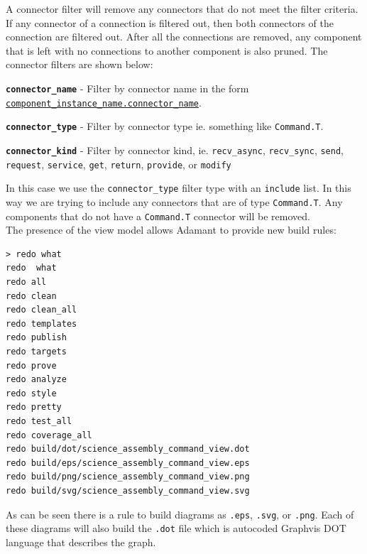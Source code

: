 A connector filter will remove any connectors that do not meet the filter criteria. If any connector of a connection is filtered out, then both connectors of the connection are filtered out. After all the connections are removed, any component that is left with no connections to another component is also pruned. The connector filters are shown below:

\vspace{5mm} %
\begin{spaceditemize}
  \item \textbf{\texttt{connector\_name}} - Filter by connector name in the form \texttt{\url{component\_instance\_name.connector\_name}}.
  \item \textbf{\texttt{connector\_type}} - Filter by connector type ie. something like \texttt{Command.T}.
  \item \textbf{\texttt{connector\_kind}} - Filter by connector kind, ie. \texttt{recv\_async}, \texttt{recv\_sync}, \texttt{send}, \texttt{request}, \texttt{service}, \texttt{get}, \texttt{return}, \texttt{provide}, or \texttt{modify}
\end{spaceditemize}
\vspace{5mm} %

In this case we use the \texttt{connector\_type} filter type with an \texttt{include} list. In this way we are trying to include any connectors that are of type \texttt{Command.T}. Any components that do not have a \texttt{Command.T} connector will be removed. \\

The presence of the view model allows Adamant to provide new build rules:

\vspace{5mm} %
\begin{verbatim}
> redo what
redo  what
redo all
redo clean
redo clean_all
redo templates
redo publish
redo targets
redo prove
redo analyze
redo style
redo pretty
redo test_all
redo coverage_all
redo build/dot/science_assembly_command_view.dot
redo build/eps/science_assembly_command_view.eps
redo build/png/science_assembly_command_view.png
redo build/svg/science_assembly_command_view.svg
\end{verbatim}
\vspace{5mm} %

As can be seen there is a rule to build diagrams as \texttt{.eps}, \texttt{.svg}, or \texttt{.png}. Each of these diagrams will also build the \texttt{.dot} file which is autocoded Graphvis DOT language that describes the graph. \\

